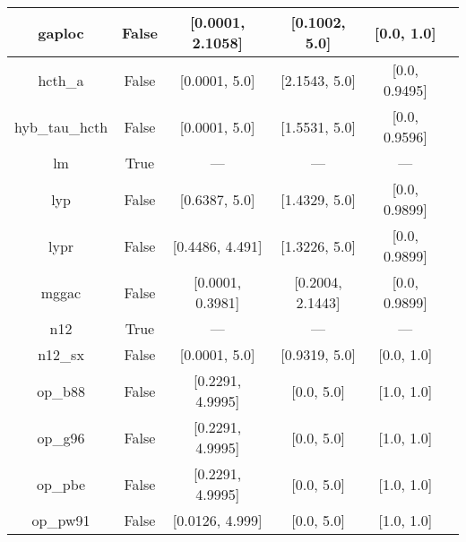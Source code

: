 \begin{tabular}{|c|c|c|c|c|l|}
        gaploc &                 False & [0.0001, 2.1058] &    [0.1002, 5.0] &       [0.0, 1.0] &                                        \cite{Fabiano2014_2016} \\ \hline
       hcth\_a &                 False &    [0.0001, 5.0] &    [2.1543, 5.0] &    [0.0, 0.9495] &                                      \cite{Hamprecht1998_6264} \\ \hline
hyb\_tau\_hcth &                 False &    [0.0001, 5.0] &    [1.5531, 5.0] &    [0.0, 0.9596] &                                          \cite{Boese2002_9559} \\ \hline
            lm &                  True &              --- &              --- &              --- &                             \cite{Langreth1981_446,Hu1985_391} \\ \hline
           lyp &                 False &    [0.6387, 5.0] &    [1.4329, 5.0] &    [0.0, 0.9899] &                            \cite{Lee1988_785,Miehlich1989_200} \\ \hline
          lypr &                 False &  [0.4486, 4.491] &    [1.3226, 5.0] &    [0.0, 0.9899] &                                             \cite{Ai2021_1207} \\ \hline
         mggac &                 False & [0.0001, 0.3981] & [0.2004, 2.1443] &    [0.0, 0.9899] &                                        \cite{Patra2019_155140} \\ \hline
           n12 &                  True &              --- &              --- &              --- &                                       \cite{Peverati2012_2310} \\ \hline
       n12\_sx &                 False &    [0.0001, 5.0] &    [0.9319, 5.0] &       [0.0, 1.0] &                                      \cite{Peverati2012_16187} \\ \hline
       op\_b88 &                 False & [0.2291, 4.9995] &       [0.0, 5.0] &       [1.0, 1.0] &                                       \cite{Tsuneda1999_10664} \\ \hline
       op\_g96 &                 False & [0.2291, 4.9995] &       [0.0, 5.0] &       [1.0, 1.0] &                      \cite{Tsuneda1999_10664,Tsuneda1999_5656} \\ \hline
       op\_pbe &                 False & [0.2291, 4.9995] &       [0.0, 5.0] &       [1.0, 1.0] &                      \cite{Tsuneda1999_10664,Tsuneda1999_5656} \\ \hline
      op\_pw91 &                 False &  [0.0126, 4.999] &       [0.0, 5.0] &       [1.0, 1.0] &                      \cite{Tsuneda1999_10664,Tsuneda1999_5656} \\ \hline

\end{tabular}
